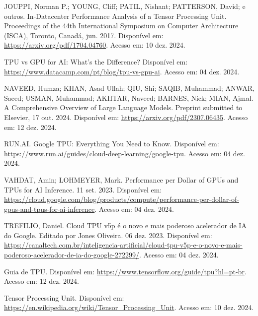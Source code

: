 \documentclass{report}
\begin{document}



JOUPPI, Norman P.; YOUNG, Cliff; PATIL, Nishant; PATTERSON, David; e outros. In-Datacenter Performance Analysis of a Tensor Processing Unit. Proceedings of the 44th International Symposium on Computer Architecture (ISCA), Toronto, Canadá, jun. 2017. Disponível em: \href{https://arxiv.org/pdf/1704.04760}{https://arxiv.org/pdf/1704.04760}. Acesso em: 10 dez. 2024.

TPU vs GPU for AI: What's the Difference? Disponível em: \href{https://www.datacamp.com/pt/blog/tpu-vs-gpu-ai}{https://www.datacamp.com/pt/blog/tpu-vs-gpu-ai}. Acesso em: 04 dez. 2024.

NAVEED, Humza; KHAN, Asad Ullah; QIU, Shi; SAQIB, Muhammad; ANWAR, Saeed; USMAN, Muhammad; AKHTAR, Naveed; BARNES, Nick; MIAN, Ajmal. A Comprehensive Overview of Large Language Models. Preprint submitted to Elsevier, 17 out. 2024. Disponível em: \href{https://arxiv.org/pdf/2307.06435}{https://arxiv.org/pdf/2307.06435}. Acesso em: 12 dez. 2024.

RUN.AI. Google TPU: Everything You Need to Know. Disponível em: \href{https://www.run.ai/guides/cloud-deep-learning/google-tpu}{https://www.run.ai/guides/cloud-deep-learning/google-tpu}. Acesso em: 04 dez. 2024.

VAHDAT, Amin; LOHMEYER, Mark. Performance per Dollar of GPUs and TPUs for AI Inference. 11 set. 2023. Disponível em: \href{https://cloud.google.com/blog/products/compute/performance-per-dollar-of-gpus-and-tpus-for-ai-inference}{https://cloud.google.com/blog/products/compute/performance-per-dollar-of-gpus-and-tpus-for-ai-inference}. Acesso em: 04 dez. 2024.

TREFILIO, Daniel. Cloud TPU v5p é o novo e mais poderoso acelerador de IA do Google. Editado por Jones Oliveira. 06 dez. 2023. Disponível em: \href{https://canaltech.com.br/inteligencia-artificial/cloud-tpu-v5p-e-o-novo-e-mais-poderoso-acelerador-de-ia-do-google-272299/}{https://canaltech.com.br/inteligencia-artificial/cloud-tpu-v5p-e-o-novo-e-mais-poderoso-acelerador-de-ia-do-google-272299/}. Acesso em: 04 dez. 2024.

Guia de TPU. Disponível em: \href{https://www.tensorflow.org/guide/tpu?hl=pt-br}{https://www.tensorflow.org/guide/tpu?hl=pt-br}. Acesso em: 12 dez. 2024.

Tensor Processing Unit. Disponível em: \href{https://en.wikipedia.org/wiki/Tensor_Processing_Unit}{https://en.wikipedia.org/wiki/Tensor\_Processing\_Unit}. Acesso em: 10 dez. 2024.
\end{document}
